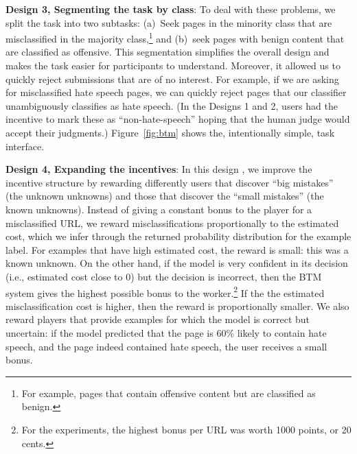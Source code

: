 \textbf{Design 3, Segmenting the task by class}: To deal with these problems, we split the task into two subtasks: (a)~Seek pages in the minority class that are misclassified in the majority class,\footnote{For example, pages that contain offensive content but are classified as benign.} and (b)~seek pages with benign content that are classified as offensive. This segmentation simplifies the overall design and makes the task easier for participants to understand.  Moreover, it allowed us to quickly reject submissions that are of no interest.  For example, if we are asking for misclassified hate speech pages, we can quickly reject pages that our classifier unambiguously classifies as hate speech. (In the Designs 1 and 2, users had the incentive to mark these as ``non-hate-speech'' hoping that the human judge would accept their judgments.) Figure~\ref{fig:btm} shows the, intentionally simple, task interface. 

\textbf{Design 4, Expanding the incentives}: In this design , we improve the incentive structure by rewarding differently users that discover ``big mistakes'' (the unknown unknowns) and those that discover the ``small mistakes'' (the known unknowns). Instead of giving a constant bonus to the player for a misclassified URL, we reward misclassifications proportionally to the estimated cost, which we infer through the returned probability distribution for the example label.  
For examples that have high estimated cost, the reward is small: this was a known unknown.
On the other hand, if the model is very confident in its decision (i.e., estimated cost close to 0) but the decision is incorrect, then the BTM system gives the highest possible bonus to the worker.\footnote{For the experiments, the highest bonus per URL was worth 1000 points, or 20 cents.} If the the estimated misclassification cost is higher, then the reward is proportionally smaller. We also reward players that provide examples for which the model is correct but uncertain: if the model predicted that the page is 60\% likely to contain hate speech, and the page indeed contained hate speech, the user receives a small bonus.

